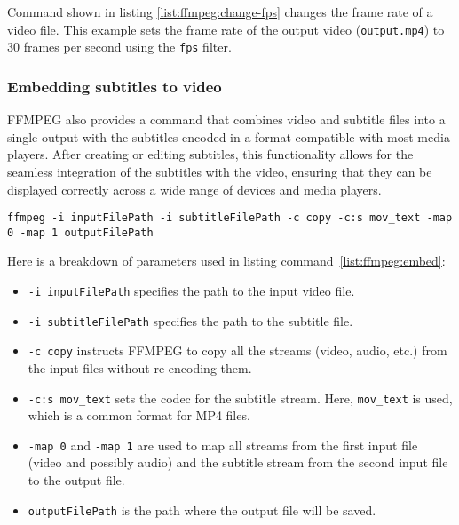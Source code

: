 Command shown in listing \ref{list:ffmpeg:change-fps} changes the frame rate of a video file. This example sets the frame rate of the output video (\texttt{output.mp4}) to 30 frames per second using the \texttt{fps} filter.

\subsubsection{Embedding subtitles to video}
\label{theory:ffmpeg:embeding-subtitles}

FFMPEG also provides a command that combines video and subtitle files into a single output with the subtitles encoded in a format compatible with most media players. After creating or editing subtitles, this functionality allows for the seamless integration of the subtitles with the video, ensuring that they can be displayed correctly across a wide range of devices and media players. \newline

\begin{clisting} 
\label{list:ffmpeg:embed}
\begin{verbatim}
ffmpeg -i inputFilePath -i subtitleFilePath -c copy -c:s mov_text -map 0 -map 1 outputFilePath
\end{verbatim}
\end{clisting}

\noindent Here is a breakdown of parameters used in listing command~\ref{list:ffmpeg:embed}:
\begin{itemize}
    \item \texttt{-i inputFilePath} specifies the path to the input video file.
    \item \texttt{-i subtitleFilePath} specifies the path to the subtitle file.
    \item \texttt{-c copy} instructs FFMPEG to copy all the streams (video, audio, etc.) from the input files without re-encoding them.
    \item \texttt{-c:s mov\_text} sets the codec for the subtitle stream. Here, \texttt{mov\_text} is used, which is a common format for MP4 files.
    \item \texttt{-map 0} and \texttt{-map 1} are used to map all streams from the first input file (video and possibly audio) and the subtitle stream from the second input file to the output file.
    \item \texttt{outputFilePath} is the path where the output file will be saved.
\end{itemize}

